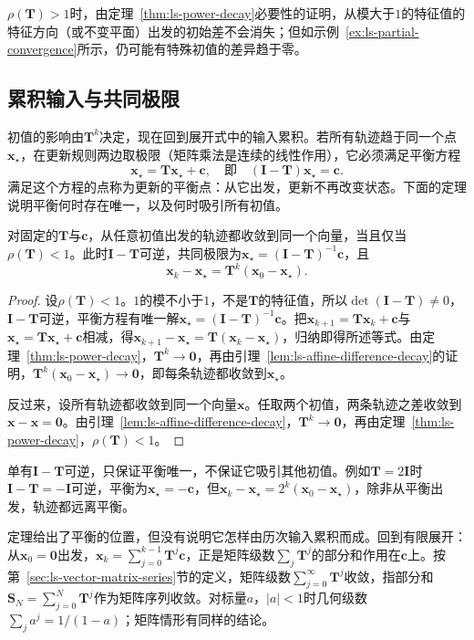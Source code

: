 $\rho(\bm T)>1$时，由定理~\ref{thm:ls-power-decay}必要性的证明，从模大于$1$的特征值的特征方向（或不变平面）出发的初始差不会消失；但如示例~\ref{ex:ls-partial-convergence}所示，仍可能有特殊初值的差异趋于零。

\subsection{累积输入与共同极限}
\label{sec:ls-matrix-series-exponential}

初值的影响由$\bm T^k$决定，现在回到展开式中的输入累积。若所有轨迹趋于同一个点$\bm x_\star$，在更新规则两边取极限（矩阵乘法是连续的线性作用），它必须满足平衡方程
\[
 \bm x_\star=\bm T\bm x_\star+\bm c ,\quad\text{即}\quad(\bm I-\bm T)\bm x_\star=\bm c .
\]
满足这个方程的点称为更新的平衡点：从它出发，更新不再改变状态。下面的定理说明平衡何时存在唯一，以及何时吸引所有初值。

\begin{theorem}[共同极限的判据]
\label{thm:ls-affine-common-limit}
对固定的$\bm T$与$\bm c$，从任意初值出发的轨迹都收敛到同一个向量，当且仅当$\rho(\bm T)<1$。此时$\bm I-\bm T$可逆，共同极限为$\bm x_\star=(\bm I-\bm T)^{-1}\bm c$，且
\[
 \bm x_k-\bm x_\star=\bm T^k(\bm x_0-\bm x_\star).
\]
\end{theorem}
\begin{proof}
设$\rho(\bm T)<1$。$1$的模不小于$1$，不是$\bm T$的特征值，所以$\det(\bm I-\bm T)\neq0$，$\bm I-\bm T$可逆，平衡方程有唯一解$\bm x_\star=(\bm I-\bm T)^{-1}\bm c$。把$\bm x_{k+1}=\bm T\bm x_k+\bm c$与$\bm x_\star=\bm T\bm x_\star+\bm c$相减，得$\bm x_{k+1}-\bm x_\star=\bm T(\bm x_k-\bm x_\star)$，归纳即得所述等式。由定理~\ref{thm:ls-power-decay}，$\bm T^k\to\bm0$，再由引理~\ref{lem:ls-affine-difference-decay}的证明，$\bm T^k(\bm x_0-\bm x_\star)\to\bm0$，即每条轨迹都收敛到$\bm x_\star$。

反过来，设所有轨迹都收敛到同一个向量$\bm x$。任取两个初值，两条轨迹之差收敛到$\bm x-\bm x=\bm0$。由引理~\ref{lem:ls-affine-difference-decay}，$\bm T^k\to\bm0$，再由定理~\ref{thm:ls-power-decay}，$\rho(\bm T)<1$。
\end{proof}
单有$\bm I-\bm T$可逆，只保证平衡唯一，不保证它吸引其他初值。例如$\bm T=2\bm I$时$\bm I-\bm T=-\bm I$可逆，平衡为$\bm x_\star=-\bm c$，但$\bm x_k-\bm x_\star=2^k(\bm x_0-\bm x_\star)$，除非从平衡出发，轨迹都远离平衡。

定理给出了平衡的位置，但没有说明它怎样由历次输入累积而成。回到有限展开：从$\bm x_0=\bm0$出发，$\bm x_k=\sum_{j=0}^{k-1}\bm T^j\bm c$，正是矩阵级数$\sum_j\bm T^j$的部分和作用在$\bm c$上。按第~\ref{sec:ls-vector-matrix-series}节的定义，矩阵级数$\sum_{j=0}^{\infty}\bm T^j$收敛，指部分和$\bm S_N=\sum_{j=0}^N\bm T^j$作为矩阵序列收敛。对标量$a$，$|a|<1$时几何级数$\sum_ja^j=1/(1-a)$；矩阵情形有同样的结论。

